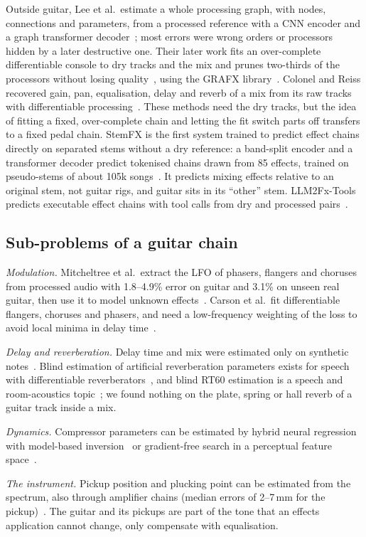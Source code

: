 Outside guitar, Lee et al.\ estimate a whole processing graph, with nodes,
connections and parameters, from a processed reference with a CNN encoder and
a graph transformer decoder~\cite{lee2023blind}; most errors were wrong orders
or processors hidden by a later destructive one. Their later work fits an
over-complete differentiable console to dry tracks and the mix and prunes
two-thirds of the processors without losing quality~\cite{lee2024searching,lee2025reverse},
using the GRAFX library~\cite{lee2024grafx}. Colonel and Reiss recovered gain,
pan, equalisation, delay and reverb of a mix from its raw tracks with
differentiable processing~\cite{colonel2021reverse}. These methods need the
dry tracks, but the idea of fitting a fixed, over-complete chain and letting
the fit switch parts off transfers to a fixed pedal chain. StemFX is the first
system trained to predict effect chains directly on separated stems without a
dry reference: a band-split encoder and a transformer decoder predict
tokenised chains drawn from 85 effects, trained on pseudo-stems of about 105k
songs~\cite{cheng2026stemfx}. It predicts mixing effects relative to an
original stem, not guitar rigs, and guitar sits in its ``other'' stem.
LLM2Fx-Tools predicts executable effect chains with tool calls from dry and
processed pairs~\cite{doh2026llm2fxtools}.

\subsection{Sub-problems of a guitar chain}

\emph{Modulation.} Mitcheltree et al.\ extract the LFO of phasers, flangers
and choruses from processed audio with 1.8--4.9\% error on guitar and 3.1\% on
unseen real guitar, then use it to model unknown effects~\cite{mitcheltree2023modulation}.
Carson et al.\ fit differentiable flangers, choruses and phasers, and need a
low-frequency weighting of the loss to avoid local minima in delay
time~\cite{carson2026gradient}.

\emph{Delay and reverberation.} Delay time and mix were estimated only on
synthetic notes~\cite{jurgens2020recognizing,hinrichs2022convolutional}.
Blind estimation of artificial reverberation parameters exists for speech with
differentiable reverberators~\cite{lee2022differentiable}, and blind RT60
estimation is a speech and room-acoustics topic~\cite{gamper2018blind}; we
found nothing on the plate, spring or hall reverb of a guitar track inside a
mix.

\emph{Dynamics.} Compressor parameters can be estimated by hybrid neural
regression with model-based inversion~\cite{sun2024neural} or gradient-free
search in a perceptual feature space~\cite{sun2026blackbox}.

\emph{The instrument.} Pickup position and plucking point can be estimated from
the spectrum, also through amplifier chains (median errors of 2--7\,mm for the
pickup)~\cite{mohamad2017pickup,mohamad2017estimating}. The guitar and its
pickups are part of the tone that an effects application cannot change, only
compensate with equalisation.
